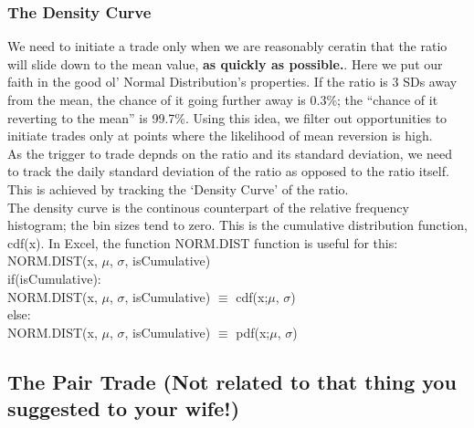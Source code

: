 \documentclass{article}
\begin{document}
\subsubsection{The Density Curve}
We need to initiate a trade only when we are reasonably ceratin that the
ratio will slide down to the mean value, \textbf{as quickly as possible.}. Here
we put our faith in the good ol' Normal Distribution's properties. If the ratio
is 3 SDs away from the mean, the chance of it going further away is 0.3\%; the ``chance of it reverting to the mean'' is 99.7\%. Using this idea, we filter
out opportunities to initiate trades only at points where the likelihood of mean
reversion is high.\\
As the trigger to trade depnds on the ratio and its standard deviation, we need to track the daily standard deviation of the ratio as opposed to the ratio itself.
This is achieved by tracking the `Density Curve' of the ratio.\\
The density curve is the continous counterpart of the relative frequency
histogram; the bin sizes tend to zero. This is the cumulative distribution function, cdf(x). In Excel, the function NORM.DIST function is useful for this:\\
NORM.DIST(x, $\mu$, $\sigma$, isCumulative)\\
if(isCumulative):\\
\indent NORM.DIST(x, $\mu$, $\sigma$, isCumulative) $\equiv$ cdf(x;$\mu$, $\sigma$)\\
else:\\
\indent NORM.DIST(x, $\mu$, $\sigma$, isCumulative) $\equiv$ pdf(x;$\mu$, $\sigma$)
\subsection{The Pair Trade (Not related to that thing you suggested to your wife!)}
\end{document}
